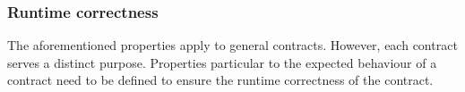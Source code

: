 \subsubsection{Runtime correctness}
The aforementioned properties apply to general contracts. However, each contract serves a distinct purpose. Properties particular to the expected behaviour of a contract need to be defined to ensure the runtime correctness of the contract.

%



%
%
%
